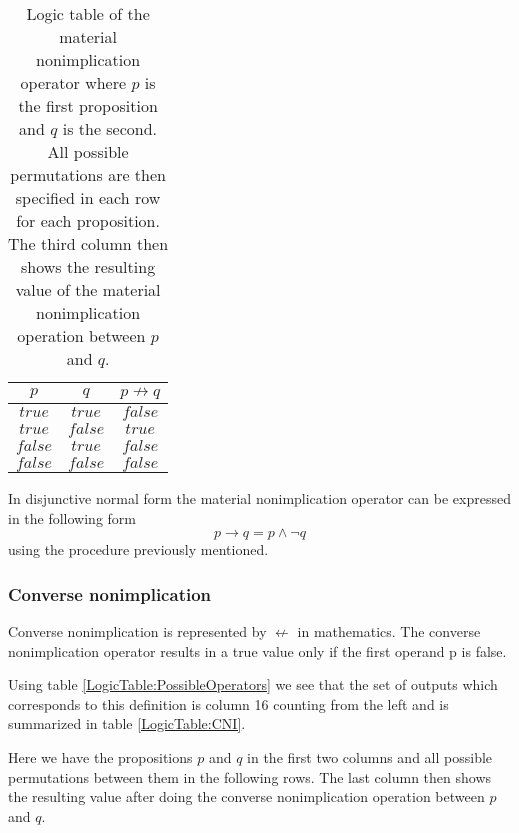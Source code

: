                 \begin{table}[h!]
                    \centering
                    \begin{tabular}{|c|c|c|}
                    	\hline
                    	  $p$   &   $q$   & $p \not\rightarrow q$ \\ \hline
                    	$true$  & $true$  &        $false$        \\ \hline
                    	$true$  & $false$ &        $true$         \\ \hline
                    	$false$ & $true$  &        $false$        \\ \hline
                    	$false$ & $false$ &        $false$        \\ \hline
                    \end{tabular}
                    \caption{Logic table of the material nonimplication operator where $p$ is the first proposition and $q$ is the second. All possible permutations are then specified in each row for each proposition. The third column then shows the resulting value of the material nonimplication operation between $p$ and $q$.}
                    \label{LogicTable:MNI}
                \end{table}
                
                In disjunctive normal form the material nonimplication operator can be expressed in the following form
                \begin{equation}
                p \rightarrow q = p \wedge \neg q 
                \end{equation}
                using the procedure previously mentioned.
                
            \subsubsection{Converse nonimplication}
                Converse nonimplication is represented by $\not\leftarrow$ in mathematics. The converse nonimplication operator results in a true value only if the first operand p is false.
                
                Using table \ref{LogicTable:PossibleOperators} we see that the set of outputs which corresponds to this definition is column 16 counting from the left and is summarized in table \ref{LogicTable:CNI}.
                
                Here we have the propositions $p$ and $q$ in the first two columns and all possible permutations between them in the following rows. The last column then shows the resulting value after doing the converse nonimplication operation between $p$ and $q$.
                
